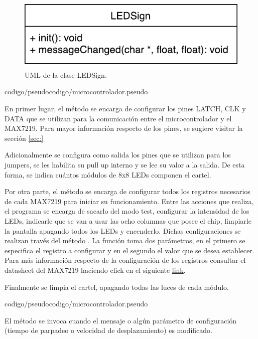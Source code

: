 \begin{figure}[!ht]
	\centering
	\includegraphics[scale=0.8]{imagenes/uml/LEDSign.pdf}
	\caption{UML de la clase LEDSign.}
	\label{uml:ledSign}
\end{figure}

 {codigo/pseudocodigo/microcontrolador.pseudo}

En primer lugar, el método  se encarga de configurar los pines LATCH, CLK y DATA que se utilizan para la comunicación entre el microcontrolador y el MAX7219.
Para mayor información respecto de los pines, se sugiere visitar la sección \ref{sec:} %

Adicionalmente se configura como salida los pines que se utilizan para los jumpers, se les habilita su pull up interno y se lee su valor a la salida.
De esta forma, se indica cuántos módulos de 8x8 LEDs componen el cartel.

Por otra parte, el método se encarga de configurar todos los registros necesarios de cada MAX7219 para iniciar su funcionamiento.
Entre las acciones que realiza, el programa se encarga de sacarlo del modo test, configurar la intensidad de los LEDs, indicarle que se van a usar las ocho columnas que posee el chip, limpiarle la pantalla apagando todos los LEDs y encenderlo.
Dichas configuraciones se realizan través del método .
La función toma dos parámetros, en el primero se especifica el registro a configurar y en el segundo el valor que se desea establecer.
Para más información respecto de la configuración de los registros consultar el datasheet del MAX7219 haciendo click en el siguiente \href{https://datasheets.maximintegrated.com/en/ds/MAX7219-MAX7221.pdf}{link}.

Finalmente se limpia el cartel, apagando todas las luces de cada módulo.

 {codigo/pseudocodigo/microcontrolador.pseudo}

El método  se invoca cuando el mensaje o algún parámetro de configuración (tiempo de parpadeo o velocidad de desplazamiento) es modificado.

